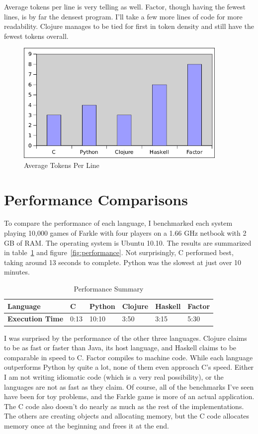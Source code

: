 \documentclass{article}
\begin{document}
Average tokens per line is very telling as well.  Factor, though having the
fewest lines, is by far the densest program.  I'll take a few more lines of code
for more readability.  Clojure manages to be tied for first in token density and
still have the fewest tokens overall.

\begin{figure}[h]
    \centering
    \includegraphics[width=4in]{graphs/average-tokens-per-line.png}
    \caption{Average Tokens Per Line \label{fig:averagetokens}}
\end{figure}

\section{Performance Comparisons}

To compare the performance of each language, I benchmarked each system playing
10,000 games of Farkle with four players on a 1.66 GHz netbook with 2 GB of RAM.
The operating system is Ubuntu 10.10.  The results are summarized in
table~\ref{tab:performance} and figure~\ref{fig:performance}.  Not surprisingly,
C performed best, taking around 13 seconds to complete.  Python was the slowest
at just over 10 minutes.

\begin{table}[h]
    \caption{Performance Summary \label{tab:performance}}
    \begin{tabular}{|p{1.2in}|p{0.3in}|p{0.5in}|p{0.5in}|p{0.5in}|p{0.5in}|}
        \hline
        {\bf Language} & {\bf C} & {\bf Python} & {\bf Clojure} & {\bf Haskell} & {\bf Factor} \\
        \hline
        {\bf Execution Time} & 0:13 & 10:10 & 3:50 & 3:15 & 5:30 \\
        \hline
    \end{tabular}
\end{table}

I was surprised by the performance of the other three languages.  Clojure claims
to be as fast or faster than Java, its host language, and Haskell claims to be
comparable in speed to C.  Factor compiles to machine code.  While each language
outperforms Python by quite a lot, none of them even approach C's speed.  Either
I am not writing idiomatic code (which is a very real possibility), or the
languages are not as fast as they claim.  Of course, all of the benchmarks I've
seen have been for toy problems, and the Farkle game is more of an actual
application.  The C code also doesn't do nearly as much as the rest of the
implementations.  The others are creating objects and allocating memory, but the
C code allocates memory once at the beginning and frees it at the end.
\end{document}
